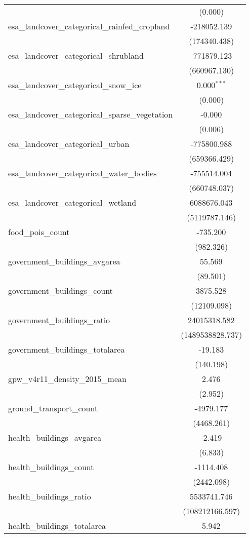 \begin{table}[!htbp]
\begin{tabular}{@{\extracolsep{5pt}}lc}
  & (0.000) \\
 esa_landcover_categorical_rainfed_cropland & -218052.139$^{}$ \\
  & (174340.438) \\
 esa_landcover_categorical_shrubland & -771879.123$^{}$ \\
  & (660967.130) \\
 esa_landcover_categorical_snow_ice & 0.000$^{***}$ \\
  & (0.000) \\
 esa_landcover_categorical_sparse_vegetation & -0.000$^{}$ \\
  & (0.006) \\
 esa_landcover_categorical_urban & -775800.988$^{}$ \\
  & (659366.429) \\
 esa_landcover_categorical_water_bodies & -755514.004$^{}$ \\
  & (660748.037) \\
 esa_landcover_categorical_wetland & 6088676.043$^{}$ \\
  & (5119787.146) \\
 food_pois_count & -735.200$^{}$ \\
  & (982.326) \\
 government_buildings_avgarea & 55.569$^{}$ \\
  & (89.501) \\
 government_buildings_count & 3875.528$^{}$ \\
  & (12109.098) \\
 government_buildings_ratio & 24015318.582$^{}$ \\
  & (1489538828.737) \\
 government_buildings_totalarea & -19.183$^{}$ \\
  & (140.198) \\
 gpw_v4r11_density_2015_mean & 2.476$^{}$ \\
  & (2.952) \\
 ground_transport_count & -4979.177$^{}$ \\
  & (4468.261) \\
 health_buildings_avgarea & -2.419$^{}$ \\
  & (6.833) \\
 health_buildings_count & -1114.408$^{}$ \\
  & (2442.098) \\
 health_buildings_ratio & 5533741.746$^{}$ \\
  & (108212166.597) \\
 health_buildings_totalarea & 5.942$^{}$ \\

\end{tabular}
\end{table}
